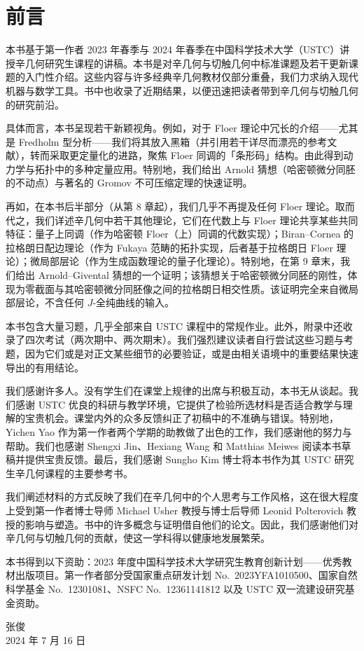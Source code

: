 \chapter*{前言}

本书基于第一作者 2023 年春季与 2024 年春季在中国科学技术大学（USTC）讲授辛几何研究生课程的讲稿。本书是对辛几何与切触几何中标准课题及若干更新课题的入门性介绍。这些内容与许多经典辛几何教材仅部分重叠，我们力求纳入现代机器与数学工具。书中也收录了近期结果，以便迅速把读者带到辛几何与切触几何的研究前沿。

具体而言，本书呈现若干新颖视角。例如，对于 Floer 理论中冗长的介绍——尤其是 Fredholm 型分析——我们将其放入黑箱（并引用若干详尽而漂亮的参考文献），转而采取更定量化的进路，聚焦 Floer 同调的「条形码」结构。由此得到动力学与拓扑中的多种定量应用。特别地，我们给出 Arnold 猜想（哈密顿微分同胚的不动点）与著名的 Gromov 不可压缩定理的快速证明。

再如，在本书后半部分（从第 8 章起），我们几乎不再提及任何 Floer 理论。取而代之，我们详述辛几何中若干其他理论，它们在代数上与 Floer 理论共享某些共同特征：量子上同调（作为哈密顿 Floer（上）同调的代数实现）；Biran--Cornea 的拉格朗日配边理论（作为 Fukaya 范畴的拓扑实现，后者基于拉格朗日 Floer 理论）；微局部层论（作为生成函数理论的量子化理论）。特别地，在第 9 章末，我们给出 Arnold--Givental 猜想的一个证明；该猜想关于哈密顿微分同胚的刚性，体现为零截面与其哈密顿微分同胚像之间的拉格朗日相交性质。该证明完全来自微局部层论，不含任何 $J$-全纯曲线的输入。

本书包含大量习题，几乎全部来自 USTC 课程中的常规作业。此外，附录中还收录了四次考试（两次期中、两次期末）。我们强烈建议读者自行尝试这些习题与考题，因为它们或是对正文某些细节的必要验证，或是由相关语境中的重要结果快速导出的有用结论。

我们感谢许多人。没有学生们在课堂上规律的出席与积极互动，本书无从谈起。我们感谢 USTC 优良的科研与教学环境，它提供了检验所选材料是否适合教学与理解的宝贵机会。课堂内外的众多反馈纠正了初稿中的不准确与错误。特别地，Yichen Yao 作为第一作者两个学期的助教做了出色的工作，我们感谢他的努力与帮助。我们也感谢 Shengxi Jin、Hexiang Wang 和 Matthias Meiwes 阅读本书草稿并提供宝贵反馈。最后，我们感谢 Sungho Kim 博士将本书作为其 USTC 研究生辛几何课程的主要参考书。

我们阐述材料的方式反映了我们在辛几何中的个人思考与工作风格，这在很大程度上受到第一作者博士导师 Michael Usher 教授与博士后导师 Leonid Polterovich 教授的影响与塑造。书中的许多概念与证明借自他们的论文。因此，我们感谢他们对辛几何与切触几何的贡献，使这一学科得以健康地发展繁荣。

本书得到以下资助：2023 年度中国科学技术大学研究生教育创新计划——优秀教材出版项目。第一作者部分受国家重点研发计划 No.~2023YFA1010500、国家自然科学基金 No.~12301081、NSFC No.~12361141812 以及 USTC 双一流建设研究基金资助。

\vspace{1.5em}
\begin{flushright}
张俊\\
2024 年 7 月 16 日
\end{flushright}

\clearpage
\tableofcontents
